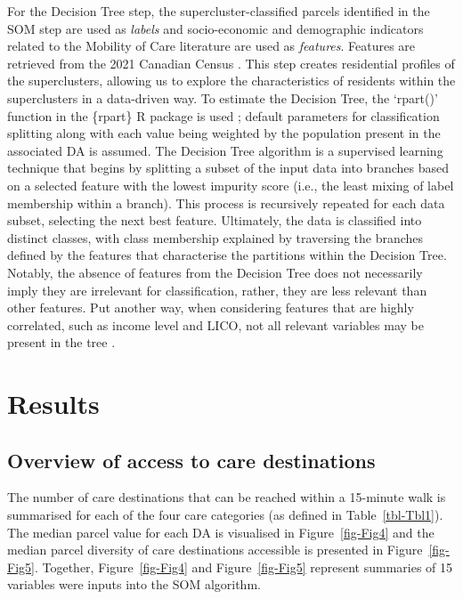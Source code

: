 \documentclass[
  authoryear,
  preprint,
  3p]{elsarticle}
\begin{document}
For the Decision Tree step, the supercluster-classified parcels
identified in the SOM step are used as \emph{labels} and socio-economic
and demographic indicators related to the Mobility of Care literature
are used as \emph{features}. Features are retrieved from the 2021
Canadian Census \citep{governmentofcanadaCensusPopulation2023}. This
step creates residential profiles of the superclusters, allowing us to
explore the characteristics of residents within the superclusters in a
data-driven way. To estimate the Decision Tree, the `rpart()' function
in the \{rpart\} R package is used \citep{Therneau2023}; default
parameters for classification splitting along with each value being
weighted by the population present in the associated DA is assumed. The
Decision Tree algorithm is a supervised learning technique that begins
by splitting a subset of the input data into branches based on a
selected feature with the lowest impurity score (i.e., the least mixing
of label membership within a branch). This process is recursively
repeated for each data subset, selecting the next best feature.
Ultimately, the data is classified into distinct classes, with class
membership explained by traversing the branches defined by the features
that characterise the partitions within the Decision Tree. Notably, the
absence of features from the Decision Tree does not necessarily imply
they are irrelevant for classification, rather, they are less relevant
than other features. Put another way, when considering features that are
highly correlated, such as income level and LICO, not all relevant
variables may be present in the tree
\citep{victorianoTimeSpaceMoney2020}.

\section{Results}\label{results}

\subsection{Overview of access to care
destinations}\label{overview-of-access-to-care-destinations}

The number of care destinations that can be reached within a 15-minute
walk is summarised for each of the four care categories (as defined in
Table~\ref{tbl-Tbl1}). The median parcel value for each DA is visualised
in Figure~\ref{fig-Fig4} and the median parcel diversity of care
destinations accessible is presented in Figure~\ref{fig-Fig5}. Together,
Figure~\ref{fig-Fig4} and Figure~\ref{fig-Fig5} represent summaries of
15 variables were inputs into the SOM algorithm.
\end{document}
